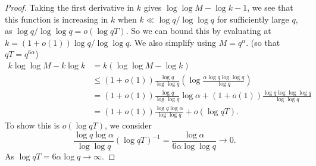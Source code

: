 \begin{proof}
    Taking the first derivative in $k$ gives $\log \log M -\log k - 1$, we see that this function is increasing in $k$ when $k\ll \log q/\log \log q$ for sufficiently large $q$, as $\log q/\log \log q = o(\log qT)$.
    So we can bound this by evaluating at $k=(1+o(1))\log q/\log \log q.$ We also simplify using $M=q^{\alpha}$. (so that $qT=q^{6\alpha}$) \begin{align*}
        k\log \log M - k\log k &=k(\log \log M -\log k)\\&\leq  (1+o(1))\frac{\log q}{\log \log q} \left(\log \frac{\alpha \log q \log \log q}{\log q}\right) \\&=(1+o(1))\frac{\log q}{\log \log q}\log \alpha + (1+o(1))\frac{\log q\log \log \log q}{\log \log q}
        \\&=(1+o(1))\frac{\log q \log \alpha}{\log \log q} + o(\log qT). 
    \end{align*}
    To show this is $o(\log qT)$, we consider \[
    \frac{\log q\log \alpha}{\log \log q} (\log qT)^{-1} =\frac{\log \alpha}{6\alpha \log \log q} \to 0.
    \]
    As $\log qT = 6\alpha \log q \to \infty$.

\end{proof}
